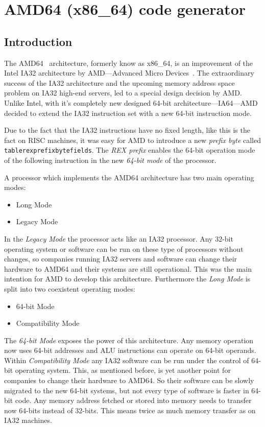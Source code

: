 \section{AMD64 (x86\_64) code generator}
\label{sectionamd64codegenerator}


\subsection{Introduction}

The AMD64~\cite{AMD64} architecture, formerly know as x86\_64, is an
improvement of the Intel IA32 architecture by AMD---Advanced Micro
Devices~\cite{AMD}. The extraordinary success of the IA32 architecture
and the upcoming memory address space problem on IA32 high-end
servers, led to a special design decision by AMD. Unlike Intel, with
it's completely new designed 64-bit architecture---IA64---AMD decided
to extend the IA32 instruction set with a new 64-bit instruction mode.

Due to the fact that the IA32 instructions have no fixed length, like
this is the fact on RISC machines, it was easy for AMD to introduce a
new \textit{prefix byte} called \texttt{tablerexprefixbytefields}. The
\textit{REX prefix} enables the 64-bit operation mode of the following
instruction in the new \textit{64-bit mode} of the processor.

A processor which implements the AMD64 architecture has two main
operating modes:

\begin{itemize}
\item Long Mode
\item Legacy Mode
\end{itemize}

In the \textit{Legacy Mode} the processor acts like an IA32
processor. Any 32-bit operating system or software can be run on these
type of processors without changes, so companies running IA32 servers
and software can change their hardware to AMD64 and their systems are
still operational. This was the main intention for AMD to develop this
architecture. Furthermore the \textit{Long Mode} is split into two
coexistent operating modes:

\begin{itemize}
\item 64-bit Mode
\item Compatibility Mode
\end{itemize}

The \textit{64-bit Mode} exposes the power of this architecture. Any
memory operation now uses 64-bit addresses and ALU instructions can
operate on 64-bit operands. Within \textit{Compatibility Mode} any
IA32 software can be run under the control of 64-bit operating
system. This, as mentioned before, is yet another point for companies
to change their hardware to AMD64. So their software can be slowly
migrated to the new 64-bit systems, but not every type of software is
faster in 64-bit code. Any memory address fetched or stored into
memory needs to transfer now 64-bits instead of 32-bits. This means
twice as much memory transfer as on IA32 machines.

